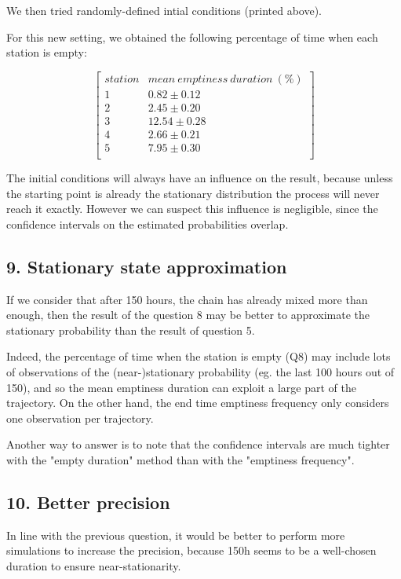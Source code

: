 \documentclass[11pt]{article}
\begin{document}
    

    We then tried randomly-defined intial conditions (printed above).

For this new setting, we obtained the following percentage of time when
each station is empty:

\[\begin{bmatrix}
station & mean~emptiness~duration ~ (\%)\\
1 & 0.82 ± 0.12\\
2 & 2.45 ± 0.20\\
3 & 12.54 ± 0.28\\
4 & 2.66 ± 0.21\\
5 & 7.95 ± 0.30\\
\end{bmatrix}\]

    The initial conditions will always have an influence on the result,
because unless the starting point is already the stationary distribution
the process will never reach it exactly. However we can suspect this
influence is negligible, since the confidence intervals on the estimated
probabilities overlap.

    \subsection{9. Stationary state
approximation}\label{stationary-state-approximation}

If we consider that after 150 hours, the chain has already mixed more
than enough, then the result of the question 8 may be better to
approximate the stationary probability than the result of question 5.

Indeed, the percentage of time when the station is empty (Q8) may
include lots of observations of the (near-)stationary probability (eg.
the last 100 hours out of 150), and so the mean emptiness duration can
exploit a large part of the trajectory. On the other hand, the end time
emptiness frequency only considers one observation per trajectory.

Another way to answer is to note that the confidence intervals are much
tighter with the "empty duration" method than with the "emptiness
frequency".

    \subsection{10. Better precision}\label{better-precision}

    In line with the previous question, it would be better to perform more
simulations to increase the precision, because 150h seems to be a
well-chosen duration to ensure near-stationarity.
\end{document}
